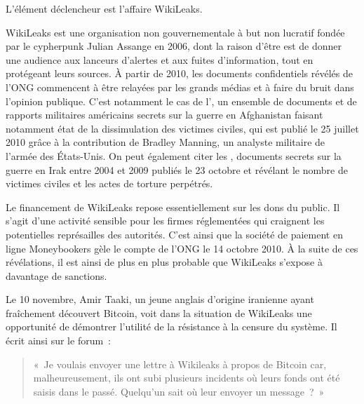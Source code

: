 
L'élément déclencheur est l'affaire WikiLeaks.

WikiLeaks est une organisation non gouvernementale à but non lucratif fondée par le cypherpunk Julian Assange en 2006, dont la raison d'être est de donner une audience aux lanceurs d'alertes et aux fuites d'information, tout en protégeant leurs sources. À partir de 2010, les documents confidentiels révélés de l'ONG commencent à être relayées par les grands médias et à faire du bruit dans l'opinion publique. C'est notamment le cas de l', un ensemble de documents et de rapports militaires américains secrets sur la guerre en Afghanistan faisant notamment état de la dissimulation des victimes civiles, qui est publié le 25 juillet 2010 grâce à la contribution de Bradley Manning, un analyste militaire de l'armée des États-Unis. On peut également citer les , documents secrets sur la guerre en Irak entre 2004 et 2009 publiés le 23 octobre et révélant le nombre de victimes civiles et les actes de torture perpétrés. %

Le financement de WikiLeaks repose essentiellement sur les dons du public. Il s'agit d'une activité sensible pour les firmes réglementées qui craignent les potentielles représailles des autorités. C'est ainsi que la société de paiement en ligne Moneybookers gèle le compte de l'ONG le 14 octobre 2010. À la suite de ces révélations, il est ainsi de plus en plus probable que WikiLeaks s'expose à davantage de sanctions.

Le 10 novembre, Amir Taaki, un jeune anglais d'origine iranienne ayant fraîchement découvert Bitcoin, voit dans la situation de WikiLeaks une opportunité de démontrer l'utilité de la résistance à la censure du système. Il écrit ainsi sur le forum~:

\begin{quote}
«~Je voulais envoyer une lettre à Wikileaks à propos de Bitcoin car, malheureusement, ils ont subi plusieurs incidents où leurs fonds ont été saisis dans le passé. Quelqu'un sait où leur envoyer un message~?~»
\end{quote}

